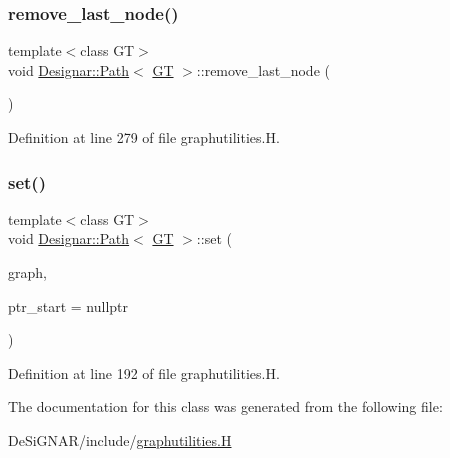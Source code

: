 \subsubsection{\texorpdfstring{remove\+\_\+last\+\_\+node()}{remove\_last\_node()}}
{\footnotesize\ttfamily template$<$class GT$>$ \\
void \hyperlink{class_designar_1_1_path}{Designar\+::\+Path}$<$ \hyperlink{demo-buildgraph_8_c_a3001c40d2c31ca87ed96cd7d1334a55e}{GT} $>$\+::remove\+\_\+last\+\_\+node (\begin{DoxyParamCaption}{ }\end{DoxyParamCaption})\hspace{0.3cm}{\ttfamily [inline]}}



Definition at line 279 of file graphutilities.\+H.

\mbox{\label{class_designar_1_1_path_a72190e285c2c85aae75b0c8435f1eee9}} 
\subsubsection{\texorpdfstring{set()}{set()}}
{\footnotesize\ttfamily template$<$class GT$>$ \\
void \hyperlink{class_designar_1_1_path}{Designar\+::\+Path}$<$ \hyperlink{demo-buildgraph_8_c_a3001c40d2c31ca87ed96cd7d1334a55e}{GT} $>$\+::set (\begin{DoxyParamCaption}\item[{\hyperlink{demo-buildgraph_8_c_a3001c40d2c31ca87ed96cd7d1334a55e}{GT} \&}]{graph,  }\item[{\hyperlink{class_designar_1_1_path_a7b499fd50e96e3360968d4cfef7a3736}{Node\+Type} $\ast$}]{ptr\+\_\+start = {\ttfamily nullptr} }\end{DoxyParamCaption})\hspace{0.3cm}{\ttfamily [inline]}}



Definition at line 192 of file graphutilities.\+H.



The documentation for this class was generated from the following file\+:\begin{DoxyCompactItemize}
\item 
De\+Si\+G\+N\+A\+R/include/\hyperlink{graphutilities_8_h}{graphutilities.\+H}\end{DoxyCompactItemize}
